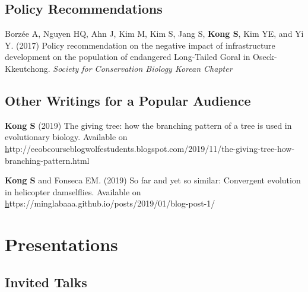 \documentclass[11pt]{article}
\begin{document}
\subsection*{Policy Recommendations}
\begin{etaremune}


\item Borzée A, Nguyen HQ, Ahn J, Kim M, Kim S, Jang S, \textbf{Kong S}, Kim YE, and Yi Y. (2017) Policy recommendation on the negative impact of infrastructure development on the population of endangered Long-Tailed Goral in Oseck-Kkeutchong. \textit{Society for Conservation Biology Korean Chapter}

\end{etaremune}

\subsection*{Other Writings for a Popular Audience}
\begin{etaremune}

\item \textbf{Kong S} (2019) The giving tree: how the branching pattern of a tree is used in evolutionary biology. Available on \href{http://eeobcourseblogwolfestudents.blogspot.com/2019/11/the-giving-tree-how-branching-pattern.html}http://eeobcourseblogwolfestudents.blogspot.com/2019/11/the-giving-tree-how-branching-pattern.html
\item \textbf{Kong S} and Fonseca  EM. (2019) So far and yet so similar: Convergent evolution in helicopter damselflies. Available on \href{https://minglabaaa.github.io/posts/2019/01/blog-post-1/}https://minglabaaa.github.io/posts/2019/01/blog-post-1/



\end{etaremune}












\section*{Presentations}

\subsection*{Invited Talks}
\end{document}
